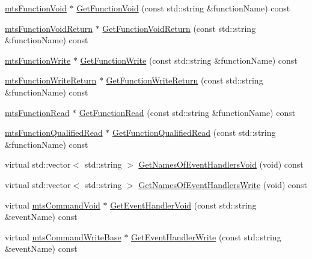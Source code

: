 {\bf }\par
\begin{DoxyCompactItemize}
\item 
\hyperlink{classmts_function_void}{mts\+Function\+Void} $\ast$ \hyperlink{classmts_interface_required_ab156f9cad1e69fe8456179042cc4806a}{Get\+Function\+Void} (const std\+::string \&function\+Name) const 
\item 
\hyperlink{classmts_function_void_return}{mts\+Function\+Void\+Return} $\ast$ \hyperlink{classmts_interface_required_a5a72c1384648680bcf899fab524d58dd}{Get\+Function\+Void\+Return} (const std\+::string \&function\+Name) const 
\item 
\hyperlink{classmts_function_write}{mts\+Function\+Write} $\ast$ \hyperlink{classmts_interface_required_a69eac9c2fdbcc6209382cc6fb6c5bda0}{Get\+Function\+Write} (const std\+::string \&function\+Name) const 
\item 
\hyperlink{classmts_function_write_return}{mts\+Function\+Write\+Return} $\ast$ \hyperlink{classmts_interface_required_aa6149578dd20d9eb0d97aaba80cd2121}{Get\+Function\+Write\+Return} (const std\+::string \&function\+Name) const 
\item 
\hyperlink{classmts_function_read}{mts\+Function\+Read} $\ast$ \hyperlink{classmts_interface_required_a13821b12b235343bf92820d78a43584d}{Get\+Function\+Read} (const std\+::string \&function\+Name) const 
\item 
\hyperlink{classmts_function_qualified_read}{mts\+Function\+Qualified\+Read} $\ast$ \hyperlink{classmts_interface_required_ad218c505c56d2cea349a687f5926ad0f}{Get\+Function\+Qualified\+Read} (const std\+::string \&function\+Name) const 
\end{DoxyCompactItemize}

{\bf }\par
\begin{DoxyCompactItemize}
\item 
virtual std\+::vector$<$ std\+::string $>$ \hyperlink{classmts_interface_required_a47f0c0792a0cae45da75ecdf9c001eb5}{Get\+Names\+Of\+Event\+Handlers\+Void} (void) const 
\item 
virtual std\+::vector$<$ std\+::string $>$ \hyperlink{classmts_interface_required_a0aa3164f69506d2c4e3d0f590b86dfb1}{Get\+Names\+Of\+Event\+Handlers\+Write} (void) const 
\end{DoxyCompactItemize}

{\bf }\par
\begin{DoxyCompactItemize}
\item 
virtual \hyperlink{classmts_command_void}{mts\+Command\+Void} $\ast$ \hyperlink{classmts_interface_required_afb1d3622285a0dbff64a82fd87857b03}{Get\+Event\+Handler\+Void} (const std\+::string \&event\+Name) const 
\item 
virtual \hyperlink{classmts_command_write_base}{mts\+Command\+Write\+Base} $\ast$ \hyperlink{classmts_interface_required_ad9152915390ff74af0264d59357f64fb}{Get\+Event\+Handler\+Write} (const std\+::string \&event\+Name) const 
\end{DoxyCompactItemize}

